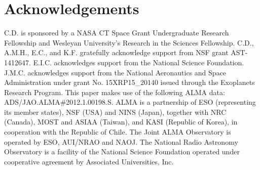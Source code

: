 \documentclass[modern]{aastex62}
\begin{document}
\section*{Acknowledgements}
C.D. is sponsored by a NASA CT Space Grant Undergraduate Research Fellowship and Wesleyan University's Research in the Sciences Fellowship.  
C.D., A.M.H., E.C., and K.F. gratefully acknowledge support from NSF grant AST-1412647.  
E.I.C. acknowledges support from the National Science Foundation.
J.M.C. acknowledges support from the National Aeronautics and Space Administration under grant No. 15XRP15\_20140 issued through the Exoplanets Research Program.
This paper makes use of the following ALMA data:  ADS/JAO.ALMA\#2012.1.00198.S.  
ALMA is a partnership of ESO (representing its member states), NSF (USA) and NINS (Japan), together with NRC (Canada), MOST and ASIAA (Taiwan), and KASI (Republic of Korea), in cooperation with the Republic of Chile.  
The Joint ALMA Observatory is operated by ESO, AUI/NRAO and NAOJ.  
The National Radio Astronomy Observatory is a facility of the National Science Foundation operated under cooperative agreement by Associated Universities, Inc.

\clearpage

\end{document}
